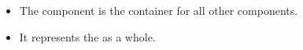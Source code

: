 \begin{itemize}
\item The   component is the container for all other components.
\item It represents the  \gdaut{} as a whole.
\end{itemize}
